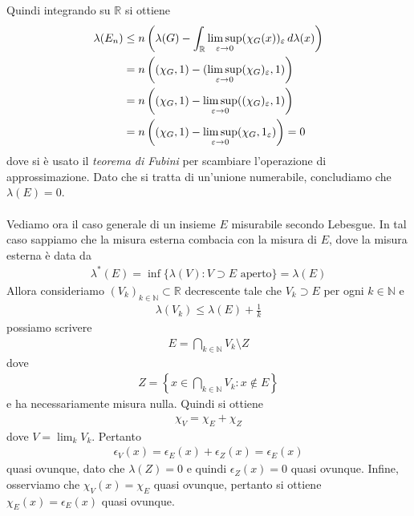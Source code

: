 \documentclass[oneside, 11pt]{amsbook}
\makeatletter
\newcommand{\R}{\mathbb{R}}
\newcommand{\co}[1]{\textit{#1}}%
\newcommand{\N}{{\mathbb N}}
\newcommand{\0}{{(0)}}
\newcommand{\3}{{(3)}}
\newcommand{\e}{{\varepsilon}}
\theoremstyle{colonplain}
\theoremstyle{colondefinition}
\theoremstyle{colonremark}
\numberwithin{equation}{chapter}
\renewcommand{\proofname}{Dimostrazione}
\renewenvironment{proof}[1][\proofname]{\par
  \pushQED{\qed}%
  \normalfont \topsep6\p@\@plus6\p@\relax
  \trivlist
  \item[\hskip\labelsep\bfseries #1:]\ignorespaces
}{%
  \popQED\endtrivlist\@endpefalse
}
\makeatother
\begin{document}
\begin{proof}
    Quindi integrando su $\R$ si ottiene
    \begin{align}
        \lambda(E_n) &\leq n\left(\lambda(G) - \int_\R \limsup_{\e \rightarrow 0} (\chi_G(x))_\e \, d\lambda(x)\right) \notag \\
        &= n\left((\chi_G, 1) - (\limsup_{\e \rightarrow 0} (\chi_G)_\e, 1)\right) \notag \\
        &= n\left((\chi_G, 1) - \limsup_{\e \rightarrow 0}((\chi_G)_\e, 1)\right) \notag \\
        &= n\left((\chi_G, 1) - \limsup_{\e \rightarrow 0}(\chi_G, 1_\e)\right) = 0
    \end{align}
    dove si è usato il \co{teorema di Fubini} per scambiare l'operazione di approssimazione. Dato che si tratta di un'unione numerabile, concludiamo che $\lambda(E) = 0$. \\ \\
    Vediamo ora il caso generale di un insieme $E$ misurabile secondo Lebesgue. In tal caso sappiamo che la misura esterna combacia con la misura di $E$, dove la misura esterna è data da
    \begin{align}
        \lambda^*(E) = \inf\{\lambda(V) : V \supset E \text{ aperto}\} = \lambda(E)
    \end{align}
    Allora consideriamo $(V_k)_{k \in \N} \subset \R$ decrescente tale che $V_k \supset E$ per ogni $k \in \N$ e
    \begin{align}
        \lambda(V_k) \leq \lambda(E) + \frac{1}{k}
    \end{align}
    possiamo scrivere
    \begin{align}
        E = \bigcap_{k \in \N} V_k \setminus Z
    \end{align}
    dove
    \begin{align}
        Z = \left\{x \in \bigcap_{k \in \N} V_k : x \not\in E\right\}
    \end{align}
    e ha necessariamente misura nulla. Quindi si ottiene
    \begin{align}
        \chi_V = \chi_E + \chi_Z
    \end{align}
    dove $V = \lim_k V_k$. Pertanto
    \begin{align}
        \epsilon_V(x) = \epsilon_E(x) + \epsilon_Z(x) = \epsilon_E(x)
    \end{align}
    quasi ovunque, dato che $\lambda(Z) = 0$ e quindi $\epsilon_Z(x) = 0$ quasi ovunque. Infine, osserviamo che $\chi_V(x) = \chi_E$ quasi ovunque, pertanto si ottiene $\chi_E(x) = \epsilon_E(x)$ quasi ovunque.
\end{proof}
\end{document}
